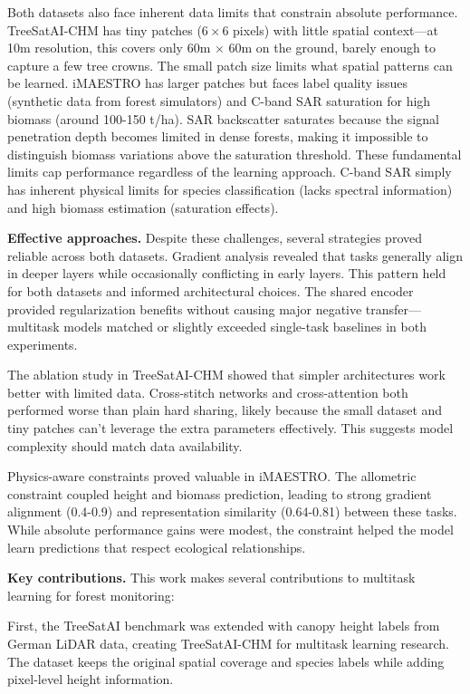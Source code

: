 Both datasets also face inherent data limits that constrain absolute performance. TreeSatAI-CHM has tiny patches ($6\times 6$ pixels) with little spatial context---at 10m resolution, this covers only 60m $\times$ 60m on the ground, barely enough to capture a few tree crowns. The small patch size limits what spatial patterns can be learned. iMAESTRO has larger patches but faces label quality issues (synthetic data from forest simulators) and C-band SAR saturation for high biomass (around 100-150 t/ha). SAR backscatter saturates because the signal penetration depth becomes limited in dense forests, making it impossible to distinguish biomass variations above the saturation threshold. These fundamental limits cap performance regardless of the learning approach. C-band SAR simply has inherent physical limits for species classification (lacks spectral information) and high biomass estimation (saturation effects).

\textbf{Effective approaches.} Despite these challenges, several strategies proved reliable across both datasets. Gradient analysis revealed that tasks generally align in deeper layers while occasionally conflicting in early layers. This pattern held for both datasets and informed architectural choices. The shared encoder provided regularization benefits without causing major negative transfer---multitask models matched or slightly exceeded single-task baselines in both experiments.

The ablation study in TreeSatAI-CHM showed that simpler architectures work better with limited data. Cross-stitch networks and cross-attention both performed worse than plain hard sharing, likely because the small dataset and tiny patches can't leverage the extra parameters effectively. This suggests model complexity should match data availability.

Physics-aware constraints proved valuable in iMAESTRO. The allometric constraint coupled height and biomass prediction, leading to strong gradient alignment (0.4-0.9) and representation similarity (0.64-0.81) between these tasks. While absolute performance gains were modest, the constraint helped the model learn predictions that respect ecological relationships.

\textbf{Key contributions.} This work makes several contributions to multitask learning for forest monitoring:

First, the TreeSatAI benchmark was extended with canopy height labels from German LiDAR data, creating TreeSatAI-CHM for multitask learning research. The dataset keeps the original spatial coverage and species labels while adding pixel-level height information.


